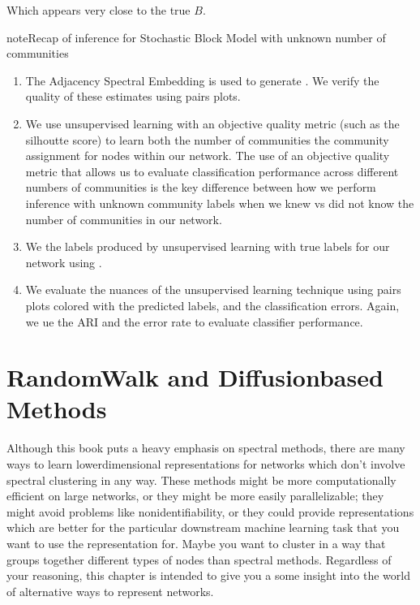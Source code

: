 \documentclass[letterpaper,10pt,english]{jupyterBook}
\begin{document}
\noindent{}

\sphinxAtStartPar
Which appears very close to the true \(B\).

\begin{sphinxadmonition}{note}{Recap of inference for Stochastic Block Model with unknown number of communities}
\begin{enumerate}
%
\item {} 
\sphinxAtStartPar
The Adjacency Spectral Embedding is used to generate . We verify the quality of these estimates using pairs plots.

\item {} 
\sphinxAtStartPar
We use unsupervised learning with an objective quality metric (such as the silhoutte score) to learn both the number of communities  the community assignment for nodes within our network. The use of an objective quality metric that allows us to evaluate classification performance across different numbers of communities is the key difference between how we perform inference with unknown community labels when we knew vs did not know the number of communities in our network.

\item {} 
\sphinxAtStartPar
We  the labels produced by unsupervised learning with true labels for our network using .

\item {} 
\sphinxAtStartPar
We evaluate the nuances of the unsupervised learning technique using pairs plots colored with the predicted labels, and the classification errors. Again, we ue the ARI and the error rate to evaluate classifier performance.

\end{enumerate}
\end{sphinxadmonition}


\section{Random\sphinxhyphen{}Walk and Diffusion\sphinxhyphen{}based Methods}
\label{\detokenize{representations/ch6/random-walk-diffusion-methods:random-walk-and-diffusion-based-methods}}\label{\detokenize{representations/ch6/random-walk-diffusion-methods::doc}}
\sphinxAtStartPar
Although this book puts a heavy emphasis on spectral methods, there are many ways to learn lower\sphinxhyphen{}dimensional representations for networks which don’t involve spectral clustering in any way. These methods might be more computationally efficient on large networks, or they might be more easily parallelizable; they might avoid problems like nonidentifiability, or they could provide representations which are better for the particular downstream machine learning task that you want to use the representation for. Maybe you want to cluster in a way that groups together different types of nodes than spectral methods. Regardless of your reasoning, this chapter is intended to give you a some insight into the world of alternative ways to represent networks.
\end{document}
